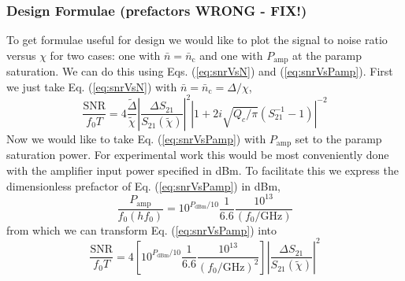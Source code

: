 \subsubsection{Design Formulae (prefactors WRONG - FIX!)}

To get formulae useful for design we would like to plot the signal to noise ratio versus $\chi$ for two cases: one with $\bar{n} = \bar{n}_{\textrm{c}}$ and one with $P_{\textrm{amp}}$ at the paramp saturation. We can do this using Eqs. (\ref{eq:snrVsN}) and (\ref{eq:snrVsPamp}). First we just take Eq. (\ref{eq:snrVsN}) with $\bar{n}=\bar{n}_{\textrm{c}}=\Delta/\chi$, \begin{equation}
\frac{\textrm{SNR}}{f_0 T} = 4\frac{\tilde{\Delta}}{\tilde{\chi}} \left| \frac{\Delta S_{21}}{S_{21}(\tilde{\chi})}\right|^2 \left| 1+2i \sqrt{Q_c/\pi} (S_{21}^{-1}-1) \right|^{-2} \end{equation}
Now we would like to take Eq. (\ref{eq:snrVsPamp}) with $P_{\textrm{amp}}$ set to the paramp saturation power. For experimental work this would be most conveniently done with the amplifier input power specified in dBm. To facilitate this we express the dimensionless prefactor of Eq. (\ref{eq:snrVsPamp}) in dBm, \begin{equation}
\frac{P_{\textrm{amp}}}{f_0(h f_0)} = 10^{P_{\textrm{dBm}}/10}\frac{1}{6.6}\frac{10^{13}}{(f_0/\textrm{GHz})} \end{equation}
from which we can transform Eq. (\ref{eq:snrVsPamp}) into \begin{equation}
\frac{\textrm{SNR}}{f_0 T} = 4 \left[ 10^{P_{\textrm{dBm}}/10}\frac{1}{6.6}\frac{10^{13}}{(f_0/\textrm{GHz})^2} \right] \left| \frac{\Delta S_{21}}{S_{21}(\tilde{\chi})} \right|^2 \end{equation}
